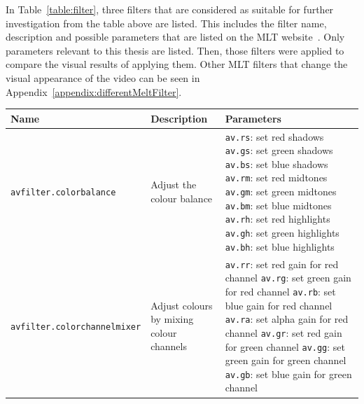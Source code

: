 \documentclass[../MasterThesis.tex]{subfiles}
\begin{document}
In Table~\ref{table:filter}, three filters that are considered as suitable for further investigation from the table above are listed. This includes the filter name, description and possible parameters that are listed on the MLT website~\cite{melt_filters}. Only parameters relevant to this thesis are listed.
Then, those filters were applied to compare the visual results of applying them. 
Other MLT filters that change the visual appearance of the video can be seen in Appendix~\ref{appendix:differentMeltFilter}.



\begin{table}[H]
	\footnotesize
	\begin{tabular}{lp{4.4cm}p{4.5cm}}
		\toprule
		Name & Description & Parameters \\
		\midrule
		\texttt{avfilter.colorbalance} & Adjust the colour balance & 
		\tiny{
		\texttt{av.rs}: set red shadows \newline 
		\texttt{av.gs}: set green shadows \newline 
		\texttt{av.bs}: set blue shadows \newline 
		\texttt{av.rm}: set red midtones \newline 
		\texttt{av.gm}: set green midtones \newline 
		\texttt{av.bm}: set blue midtones \newline 
		\texttt{av.rh}: set red highlights \newline 
		\texttt{av.gh}: set green highlights \newline 
		\texttt{av.bh}: set blue highlights}
		\\
		\texttt{avfilter.colorchannelmixer} & Adjust colours by mixing colour channels & 
		\tiny{
		\texttt{av.rr}: set red gain for red channel \newline 
		\texttt{av.rg}: set green gain for red channel \newline 
		\texttt{av.rb}: set blue gain for red channel \newline 
		\texttt{av.ra}: set alpha gain for red channel \newline 
		\texttt{av.gr}: set red gain for green channel \newline 
		\texttt{av.gg}: set green gain for green channel \newline 
		\texttt{av.gb}: set blue gain for green channel \newline 
}
\end{tabular}
\end{table}
\end{document}
